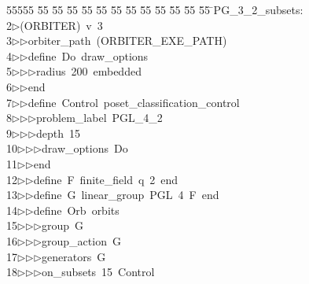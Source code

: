 %
%
\begin{tabbing}
55555 \= 55 \= 55 \= 55 \= 55 \= 55 \= 55 \= 55 \= 55 \= 55 \= 55 \= 55 \= 55 \= \>PG\_3\_2\_subsets:\\[0pt]
2\>$\triangleright$\>(ORBITER)\ v\ 3\ \\[0pt]
3\>$\triangleright$\>$\triangleright$\>orbiter\_path\ (ORBITER\_EXE\_PATH)\ \\[0pt]
4\>$\triangleright$\>$\triangleright$\>define\ Do\ draw\_options\ \\[0pt]
5\>$\triangleright$\>$\triangleright$\>$\triangleright$\>radius\ 200\ embedded\ \\[0pt]
6\>$\triangleright$\>$\triangleright$\>end\ \\[0pt]
7\>$\triangleright$\>$\triangleright$\>define\ Control\ poset\_classification\_control\ \\[0pt]
8\>$\triangleright$\>$\triangleright$\>$\triangleright$\>problem\_label\ PGL\_4\_2\ \\[0pt]
9\>$\triangleright$\>$\triangleright$\>$\triangleright$\>depth\ 15\ \\[0pt]
10\>$\triangleright$\>$\triangleright$\>$\triangleright$\>draw\_options\ Do\ \\[0pt]
11\>$\triangleright$\>$\triangleright$\>end\ \\[0pt]
12\>$\triangleright$\>$\triangleright$\>define\ F\ finite\_field\ q\ 2\ end\ \\[0pt]
13\>$\triangleright$\>$\triangleright$\>define\ G\ linear\_group\ PGL\ 4\ F\ end\ \\[0pt]
14\>$\triangleright$\>$\triangleright$\>define\ Orb\ orbits\ \\[0pt]
15\>$\triangleright$\>$\triangleright$\>$\triangleright$\>group\ G\ \\[0pt]
16\>$\triangleright$\>$\triangleright$\>$\triangleright$\>group\_action\ G\ \\[0pt]
17\>$\triangleright$\>$\triangleright$\>$\triangleright$\>generators\ G\ \\[0pt]
18\>$\triangleright$\>$\triangleright$\>$\triangleright$\>on\_subsets\ 15\ Control\ \\[0pt]

\end{tabbing}
